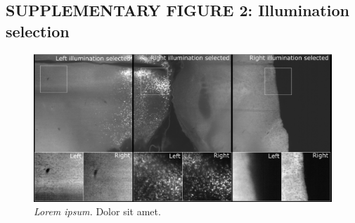 \documentclass[]{spie}  %
\begin{document}
\pagebreak


\subsection*{SUPPLEMENTARY FIGURE 2: Illumination selection}
\vspace{1mm}
\begin{figure}[h!]
\includegraphics[width=\textwidth]{Illu_Select.png}
\vspace{-2.0mm}
\caption{\hspace{-0.5mm} \emph{Lorem ipsum.} Dolor sit amet.
}
\label{fig:sup-fig-illu-select}
\end{figure}

\pagebreak
\end{document}
